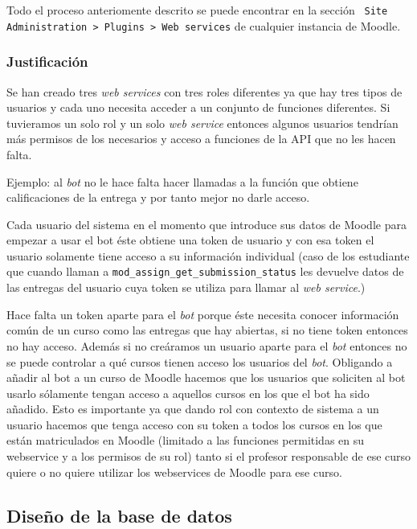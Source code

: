 Todo el proceso anteriomente descrito se puede encontrar en la sección \texttt{ Site Administration > Plugins > Web services} de cualquier instancia de Moodle.

\subsubsection{Justificación}

Se han creado tres \textit{web services} con tres roles diferentes ya que hay tres tipos de usuarios y cada uno necesita acceder a un conjunto de funciones diferentes. Si tuvieramos un solo rol y un solo \textit{web service} entonces algunos usuarios tendrían más permisos de los necesarios y acceso a funciones de la API que no les hacen falta.
\par
Ejemplo: al \textit{bot} no le hace falta hacer llamadas a la función que obtiene calificaciones de la entrega y por tanto mejor no darle acceso. 
\par
Cada usuario del sistema en el momento que introduce sus datos de Moodle para empezar a usar el bot éste obtiene una token de usuario y con esa token el usuario solamente tiene acceso a su información individual (caso de los estudiante que cuando llaman a \texttt{mod\_assign\_get\_submission\_status} les devuelve datos de las entregas del usuario cuya token se utiliza para llamar al \textit{web service}.)
\par
Hace falta un token aparte para el \textit{bot} porque éste necesita conocer información común de un curso como las entregas que hay abiertas, si no tiene token entonces no hay acceso. Además si no creáramos un usuario aparte para el \textit{bot} entonces no se puede controlar a qué cursos tienen acceso los usuarios del \textit{bot}. Obligando a añadir al bot a un curso de Moodle hacemos que los usuarios que soliciten al bot usarlo sólamente tengan acceso a aquellos cursos en los que el bot ha sido añadido. Esto es importante ya que dando rol con contexto de sistema a un usuario hacemos que tenga acceso con su token a todos los cursos en los que están matriculados en Moodle (limitado a las funciones permitidas en su webservice y a los permisos de su rol) tanto si el profesor responsable de ese curso quiere o no quiere utilizar los webservices de Moodle para ese curso.

\newpage
\subsection{Diseño de la base de datos}

